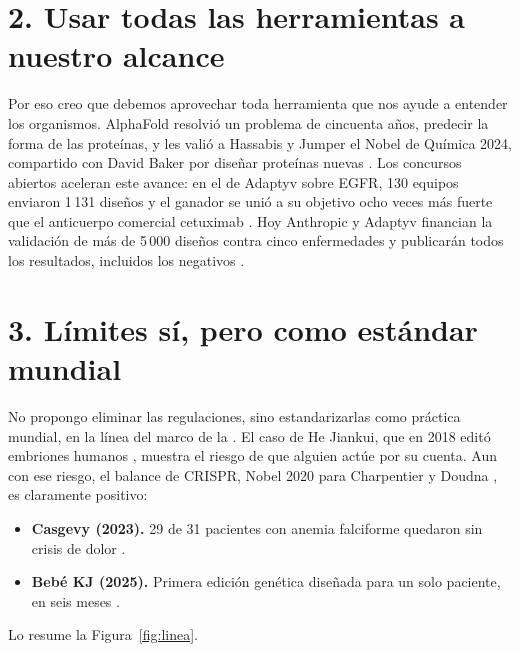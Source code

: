 \documentclass[11pt,letterpaper]{article}
\begin{document}
\section*{2. Usar todas las herramientas a nuestro alcance}

Por eso creo que debemos aprovechar toda herramienta que nos ayude a entender
los organismos. AlphaFold resolvió un problema de cincuenta años, predecir la
forma de las proteínas, y les valió a Hassabis y Jumper el Nobel de Química
2024, compartido con David Baker por diseñar proteínas nuevas
\parencite{nobel2024}. Los concursos abiertos aceleran este avance: en el de
Adaptyv sobre EGFR, 130 equipos enviaron 1\,131 diseños y el ganador se unió a
su objetivo ocho veces más fuerte que el anticuerpo comercial cetuximab
\parencite{cotet2025}. Hoy Anthropic y Adaptyv financian la validación de más
de 5\,000 diseños contra cinco enfermedades y publicarán todos los resultados,
incluidos los negativos \parencite{proteinbase2026}.

\section*{3. Límites sí, pero como estándar mundial}

No propongo eliminar las regulaciones, sino estandarizarlas como práctica
mundial, en la línea del marco de la \textcite{oms2021}. El caso de He Jiankui,
que en 2018 editó embriones humanos \parencite{cyranoski2018}, muestra el
riesgo de que alguien actúe por su cuenta. Aun con ese riesgo, el balance de
CRISPR, Nobel 2020 para Charpentier y Doudna \parencite{nobel2020}, es
claramente positivo:

\begin{itemize}[leftmargin=1.2em, itemsep=0.25em]
  \item \textbf{Casgevy (2023).} 29 de 31 pacientes con anemia falciforme
    quedaron sin crisis de dolor \parencite{fda2023}.
  \item \textbf{Bebé KJ (2025).} Primera edición genética diseñada para un solo
    paciente, en seis meses \parencite{musunuru2025}.
\end{itemize}

Lo resume la Figura~\ref{fig:linea}.
\end{document}
